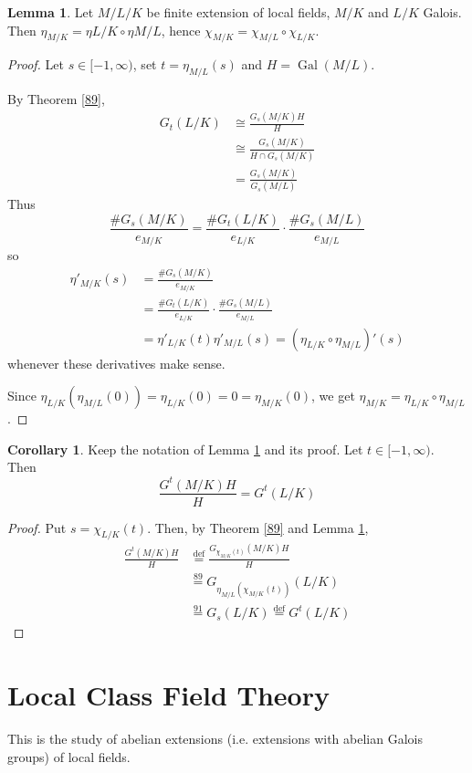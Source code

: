 \documentclass[a4paper]{article}
\theoremstyle{definition}
\theoremstyle{default}
\newtheorem{lemma}[definition]{Lemma}
\newtheorem{corollary}[definition]{Corollary}
\theoremstyle{remark}
\DeclareMathOperator{\Gal}{Gal}
\begin{document}
\begin{lemma}
	Let $M/L/K$ be finite extension of local fields, $M/K$ and $L/K$ Galois.
	Then $\eta_{M/K}=\eta{L/K}\circ\eta{M/L}$,
	hence $\chi_{M/K}=\chi_{M/L}\circ\chi_{L/K}$.
	\label{91}
\end{lemma}
\begin{proof}
	Let $s \in [-1, \infty)$, set $t=\eta_{M/L}(s)$ and $H=\Gal(M/L)$.
	
	By Theorem \ref{89},
	\begin{align*}
	G_t(L/K) &\cong \frac{G_s(M/K)H}{H} \\
	&\cong \frac{G_s(M/K)}{H \cap G_s(M/K)} \\
	&=\frac{G_s(M/K)}{G_s(M/L)}
	\end{align*}
	Thus
	$$\frac{\#G_s(M/K)}{e_{M/K}} = \frac{\#G_t(L/K)}{e_{L/K}} \cdot \frac{\#G_s(M/L)}{e_{M/L}}$$
	so
	\begin{align*}
		\eta'_{M/K}(s) &= \frac{\#G_s(M/K)}{e_{M/K}} \\
		&= \frac{\# G_t(L/K)}{e_{L/K}} \cdot \frac{\#G_s(M/L)}{e_{M/L}}\\
		&=\eta'_{L/K}(t)\eta'_{M/L}(s) = (\eta_{L/K} \circ \eta_{M/L})'(s)
	\end{align*}
	whenever these derivatives make sense.
	
	Since $\eta_{L/K}(\eta_{M/L}(0)) = \eta_{L/K}(0) = 0 = \eta_{M/K}(0)$,
	we get $\eta_{M/K} = \eta_{L/K}\circ\eta_{M/L}$.
\end{proof}

\begin{corollary}
	Keep the notation of Lemma \ref{91} and its proof.
	Let $t \in [-1, \infty)$.
	Then $$\frac{G^t(M/K)H}{H} = G^t(L/K)$$
\end{corollary}
\begin{proof}
	Put $s = \chi_{L/K}(t)$.
	Then, by Theorem \ref{89} and Lemma \ref{91},
	\begin{align*}
		\frac{G^t(M/K)H}{H} &\overset{\text{def}}{=} \frac{G_{\chi_{M/K}(t)}(M/K)H}{H} \\
		&\overset{89}{=} G_{\eta_{M/L}(\chi_{M/K}(t))}(L/K) \\
		&\overset{91}{=} G_s(L/K) \overset{\text{def}}{=} G^t(L/K)
	\end{align*}
\end{proof}

\section{Local Class Field Theory}
This is the study of abelian extensions (i.e. extensions with abelian Galois groups) of local fields.
\end{document}
